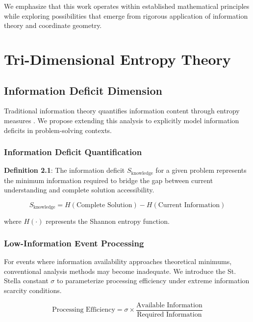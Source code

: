 \documentclass[11pt]{article}
\begin{document}
We emphasize that this work operates within established mathematical principles while exploring possibilities that emerge from rigorous application of information theory and coordinate geometry.

\section{Tri-Dimensional Entropy Theory}

\subsection{Information Deficit Dimension}

Traditional information theory quantifies information content through entropy measures \cite{shannon1948mathematical}. We propose extending this analysis to explicitly model information deficits in problem-solving contexts.

\subsubsection{Information Deficit Quantification}

\textbf{Definition 2.1}: The information deficit $S_{\text{knowledge}}$ for a given problem represents the minimum information required to bridge the gap between current understanding and complete solution accessibility.

\begin{equation}
S_{\text{knowledge}} = H(\text{Complete Solution}) - H(\text{Current Information})
\label{eq:information_deficit}
\end{equation}

where $H(\cdot)$ represents the Shannon entropy function.

\subsubsection{Low-Information Event Processing}

For events where information availability approaches theoretical minimums, conventional analysis methods may become inadequate. We introduce the St. Stella constant $\sigma$ to parameterize processing efficiency under extreme information scarcity conditions.

\begin{equation}
\text{Processing Efficiency} = \sigma \times \frac{\text{Available Information}}{\text{Required Information}}
\label{eq:stella_constant}
\end{equation}
\end{document}
